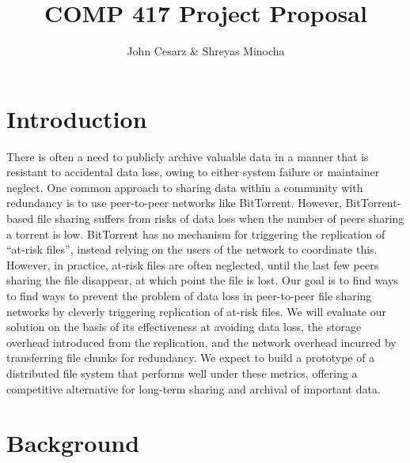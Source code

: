 \documentclass{article}
\title{COMP 417 Project Proposal}
\author{John Cesarz \& Shreyas Minocha}
\begin{document}
\maketitle

\section{Introduction}

There is often a need to publicly archive valuable data in a manner that is resistant to accidental data loss, owing to either system failure or maintainer neglect.
%
One common approach to sharing data within a community with redundancy is to use peer-to-peer networks like BitTorrent.
However, BitTorrent-based file sharing suffers from risks of data loss when the number of peers sharing a torrent is low.
BitTorrent has no mechanism for triggering the replication of ``at-risk files'', instead relying on the users of the network to coordinate this.
However, in practice, at-risk files are often neglected, until the last few peers sharing the file disappear, at which point the file is lost.
%
Our goal is to find ways to find ways to prevent the problem of data loss in peer-to-peer file sharing networks by cleverly triggering replication of at-risk files.
%
%
%
We will evaluate our solution on the basis of its effectiveness at avoiding data loss, the storage overhead introduced from the replication, and the network overhead incurred by transferring file chunks for redundancy.
%
We expect to build a prototype of a distributed file system that performs well under these metrics, offering a competitive alternative for long-term sharing and archival of important data.

\section{Background}


\lipsum[2]
\end{document}
